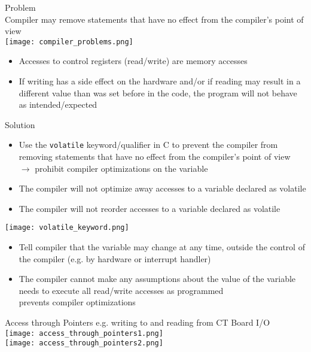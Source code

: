 \begin{concept}{Problem}\\
    Compiler may remove statements that have no effect from the compiler's point of view\\
    \texttt{[image: compiler\_problems.png]}
    \begin{itemize}
        \item Accesses to control registers (read/write) are memory accesses
        \item If writing has a side effect on the hardware and/or if reading may result in a different value than was set before in the code,
        the program will not behave as intended/expected
    \end{itemize}
\end{concept}

\begin{theorem}{Solution}\\
    \begin{itemize}
        \item Use the \texttt{volatile} keyword/qualifier in C to prevent the compiler from removing statements that have no effect from the compiler's point of view\\
        $\rightarrow$ prohibit compiler optimizations on the variable\\
        \item The compiler will not optimize away accesses to a variable declared as volatile
        \item The compiler will not reorder accesses to a variable declared as volatile
    \end{itemize}
    \texttt{[image: volatile\_keyword.png]}
    \begin{itemize}
        \item Tell compiler that the variable may change at any time, outside the control of the compiler (e.g. by hardware or interrupt handler)
        \item The compiler cannot make any assumptions about the value of the variable\\
        needs to execute all read/write accesses as programmed\\
        prevents compiler optimizations
    \end{itemize}
\end{theorem}

\begin{corollary}{Access through Pointers} e.g. writing to and reading from CT Board I/O\\
    \texttt{[image: access\_through\_pointers1.png]}\\
    \texttt{[image: access\_through\_pointers2.png]}
\end{corollary}

